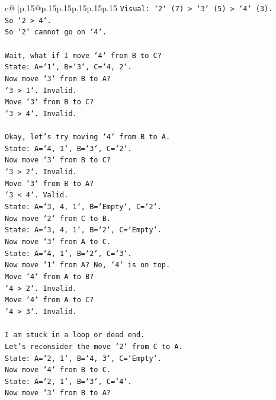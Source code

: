 \documentclass{article}
\begin{document}
{\begin{supertabular}{c@{$\;$}|p{.15\linewidth}@{}p{.15\linewidth}p{.15\linewidth}p{.15\linewidth}p{.15\linewidth}p{.15\linewidth}}
{{{\texttt{Visual: `2` (7) > `3` (5) > `4` (3).} \\
\texttt{So `2 > 4`.} \\
\texttt{So `2` cannot go on `4`.} \\
\\ 
\texttt{Wait, what if I move `4` from B to C?} \\
\texttt{State: A=`1`, B=`3`, C=`4, 2`.} \\
\texttt{Now move `3` from B to A?} \\
\texttt{`3 > 1`. Invalid.} \\
\texttt{Move `3` from B to C?} \\
\texttt{`3 > 4`. Invalid.} \\
\\ 
\texttt{Okay, let's try moving `4` from B to A.} \\
\texttt{State: A=`4, 1`, B=`3`, C=`2`.} \\
\texttt{Now move `3` from B to C?} \\
\texttt{`3 > 2`. Invalid.} \\
\texttt{Move `3` from B to A?} \\
\texttt{`3 < 4`. Valid.} \\
\texttt{State: A=`3, 4, 1`, B=`Empty`, C=`2`.} \\
\texttt{Now move `2` from C to B.} \\
\texttt{State: A=`3, 4, 1`, B=`2`, C=`Empty`.} \\
\texttt{Now move `3` from A to C.} \\
\texttt{State: A=`4, 1`, B=`2`, C=`3`.} \\
\texttt{Now move `1` from A? No, `4` is on top.} \\
\texttt{Move `4` from A to B?} \\
\texttt{`4 > 2`. Invalid.} \\
\texttt{Move `4` from A to C?} \\
\texttt{`4 > 3`. Invalid.} \\
\\ 
\texttt{I am stuck in a loop or dead end.} \\
\texttt{Let's reconsider the move `2` from C to A.} \\
\texttt{State: A=`2, 1`, B=`4, 3`, C=`Empty`.} \\
\texttt{Now move `4` from B to C.} \\
\texttt{State: A=`2, 1`, B=`3`, C=`4`.} \\
\texttt{Now move `3` from B to A?} \\
}}}
\end{supertabular}}
\end{document}
